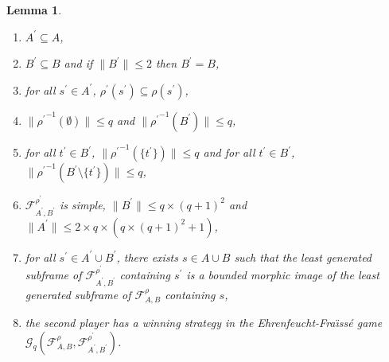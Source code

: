 \documentclass[draft]{article}
\newtheorem{lemma}{Lemma}
\begin{document}
%
%
%
%
%
%
%
%
%
%
%
%
%
%
%
%
%
%
%
%
%
%
%
%
%
%
%
%
%
%
%
%
%
%
%
%
%
%
%
%
%
%
\begin{lemma}\label{lemma:gamma:reduction:prebounded:dust:quasi:root:bounded:OK}
%
%
\begin{enumerate}
%
%
\item $A^{\prime}{\subseteq}A$,
%
%
\item $B^{\prime}{\subseteq}B$ and if ${\parallel}B^{\prime}{\parallel}{\leq}2$ then $B^{\prime}{=}B$,
%
%
\item for all $s^{\prime}{\in}A^{\prime}$, $\rho^{\prime}(s^{\prime}){\subseteq}\rho(s^{\prime})$,
%
%
\item ${\parallel}{\rho^{\prime}}^{{-}1}(\emptyset){\parallel}{\leq}q$ and ${\parallel}{\rho^{\prime}}^{{-}1}(B^{\prime}){\parallel}{\leq}q$,
%
%
\item for all $t^{\prime}{\in}B^{\prime}$, ${\parallel}{\rho^{\prime}}^{{-}1}(\{t^{\prime}\}){\parallel}{\leq}q$ and for all $t^{\prime}{\in}B^{\prime}$, ${\parallel}{\rho^{\prime}}^{{-}1}(B^{\prime}{\setminus}\{t^{\prime}\}){\parallel}{\leq}q$,
%
%
\item ${\mathcal F}_{A^{\prime},B^{\prime}}^{\rho^{\prime}}$ is simple, ${\parallel}B^{\prime}{\parallel}{\leq}q{\times}(q{+}1)^{2}$ and ${\parallel}A^{\prime}{\parallel}{\leq}2{\times}q{\times}(q{\times}(q{+}1)^{2}+1)$,
%
%
\item for all $s^{\prime}{\in}A^{\prime}{\cup}B^{\prime}$, there exists $s{\in}A{\cup}B$ such that the least generated subframe of ${\mathcal F}_{A^{\prime},B^{\prime}}^{\rho^{\prime}}$ containing $s^{\prime}$ is a bounded morphic image of the least generated subframe of ${\mathcal F}_{A,B}^{\rho}$ containing $s$,
%
%
\item the second player has a winning strategy in the Ehrenfeucht-Fra\"\i ss\'e game ${\mathcal G}_{q}({\mathcal F}_{A,B}^{\rho},{\mathcal F}_{A^{\prime},B^{\prime}}^{\rho^{\prime}})$.
%
%
\end{enumerate}
%
%
\end{lemma}
\end{document}
